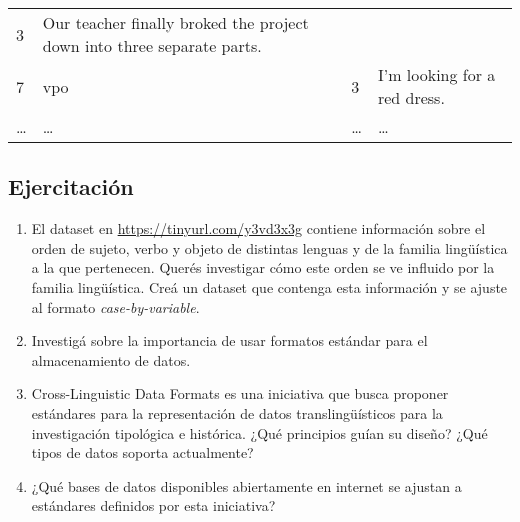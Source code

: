 \documentclass[12pt,spanish,a4paper,]{article}
\providecommand{\tightlist}{%
  \setlength{\itemsep}{0pt}\setlength{\parskip}{0pt}}
\begin{document}
\begin{longtable}[]{@{}llll@{}}
\begin{minipage}[t]{0.09\columnwidth}
3\strut
\end{minipage} & \begin{minipage}[t]{0.63\columnwidth}\raggedright
Our teacher finally broked the project down into three separate
parts.\strut
\end{minipage}\tabularnewline
\begin{minipage}[t]{0.08\columnwidth}\raggedright
7\strut
\end{minipage} & \begin{minipage}[t]{0.09\columnwidth}\raggedright
vpo\strut
\end{minipage} & \begin{minipage}[t]{0.09\columnwidth}\raggedright
3\strut
\end{minipage} & \begin{minipage}[t]{0.63\columnwidth}\raggedright
I'm looking for a red dress.\strut
\end{minipage}\tabularnewline
\begin{minipage}[t]{0.08\columnwidth}\raggedright
\ldots{}\strut
\end{minipage} & \begin{minipage}[t]{0.09\columnwidth}\raggedright
\ldots{}\strut
\end{minipage} & \begin{minipage}[t]{0.09\columnwidth}\raggedright
\ldots{}\strut
\end{minipage} & \begin{minipage}[t]{0.63\columnwidth}\raggedright
\ldots{}\strut
\end{minipage}\tabularnewline
\bottomrule
\end{longtable}

\hypertarget{ejercitacion-6}{%
\subsection{Ejercitación}\label{ejercitacion-6}}

\begin{enumerate}
\def\labelenumi{\arabic{enumi}.}
\tightlist
\item
  El dataset en \url{https://tinyurl.com/y3vd3x3g} contiene información
  sobre el orden de sujeto, verbo y objeto de distintas lenguas y de la
  familia lingüística a la que pertenecen. Querés investigar cómo este
  orden se ve influido por la familia lingüística. Creá un dataset que
  contenga esta información y se ajuste al formato
  \emph{case-by-variable}.
\item
  Investigá sobre la importancia de usar formatos estándar para el
  almacenamiento de datos.
\item
  Cross-Linguistic Data Formats es una iniciativa que busca proponer
  estándares para la representación de datos translingüísticos para la
  investigación tipológica e histórica. ¿Qué principios guían su diseño?
  ¿Qué tipos de datos soporta actualmente?
\item
  ¿Qué bases de datos disponibles abiertamente en internet se ajustan a
  estándares definidos por esta iniciativa?
\end{enumerate}
\end{document}
